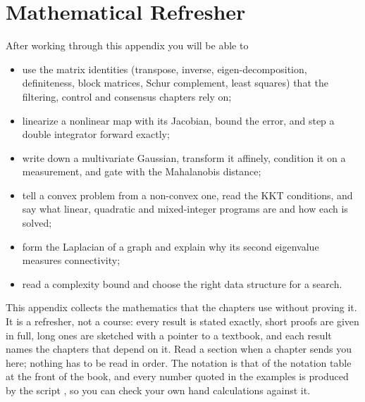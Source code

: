 \chapter{Mathematical Refresher}
\label{ch:appB}

\begin{objectives}
After working through this appendix you will be able to
\begin{itemize}
  \item use the matrix identities (transpose, inverse, eigen-decomposition, definiteness, block matrices, Schur complement, least squares) that the filtering, control and consensus chapters rely on;
  \item linearize a nonlinear map with its Jacobian, bound the error, and step a double integrator forward exactly;
  \item write down a multivariate Gaussian, transform it affinely, condition it on a measurement, and gate with the Mahalanobis distance;
  \item tell a convex problem from a non-convex one, read the KKT conditions, and say what linear, quadratic and mixed-integer programs are and how each is solved;
  \item form the Laplacian of a graph and explain why its second eigenvalue measures connectivity;
  \item read a complexity bound and choose the right \python data structure for a search.
\end{itemize}
\end{objectives}

\noindent
This appendix collects the mathematics that the chapters use without proving
it. It is a refresher, not a course: every result is stated exactly, short
proofs are given in full, long ones are sketched with a pointer to a textbook,
and each result names the chapters that depend on it. Read a section when a
chapter sends you here; nothing has to be read in order.
The notation is that of the notation table at the front of
the book, and every number quoted in the examples is produced by the script
, so you can check your own hand
calculations against it.

